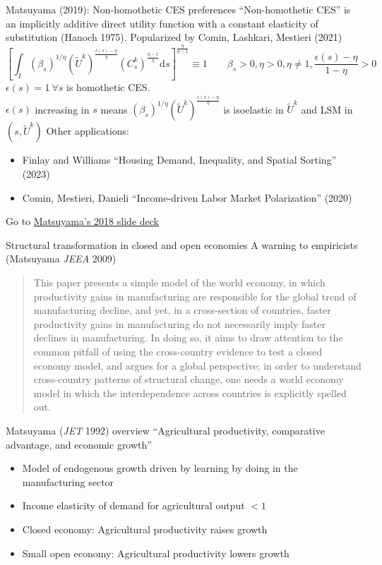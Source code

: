 \documentclass[11pt,notes=hide,aspectratio=169]{beamer}
\begin{document}
\begin{frame}{Matsuyama (2019): Non-homothetic CES preferences}
``Non-homothetic CES'' is an implicitly additive direct utility function with a constant elasticity of substitution (Hanoch 1975). Popularized by Comin, Lashkari, Mestieri (2021)
\begin{equation*}
\left[\int_{I}\left(\beta_{s}\right)^{1/\eta}\left(\tilde{U}^{k}\right)^{\frac{\epsilon(s) - \eta}{\eta}}\left(C^k_s\right)^{\frac{\eta-1}{\eta}}\textrm{d} s\right]^{\frac{\eta}{\eta-1}}
\equiv 1
\qquad
\beta_{s} > 0, \eta > 0, \eta \neq 1, \frac{\epsilon(s)-\eta}{1-\eta} >0
\end{equation*}
$\epsilon(s) = 1 \ \forall s$ is homothetic CES.\\
$\epsilon(s)$ increasing in $s$ means
$\left(\beta_{s}\right)^{1/\eta}\left(\tilde{U}^{k}\right)^{\frac{\epsilon(s) - \eta}{\eta}}$
is isoelastic in $\tilde{U}^{k}$ and LSM in $(s,\tilde{U}^{k})$
\smallskip
Other applications:
\begin{itemize}
\item {\small Finlay and Williams ``Housing Demand, Inequality, and Spatial Sorting'' (2023)}
\item {\small Comin, Mestieri, Danieli ``Income-driven Labor Market Polarization'' (2020)}
\end{itemize}
Go to \href{https://shorturl.at/txBKR}{Matsuyama's 2018 slide deck}
\end{frame}
\begin{frame}{Structural transformation in closed and open economies}
A warning to empiricists (Matsuyama \textit{JEEA} 2009)
\begin{quote}
This paper presents a simple model of the world economy, in which productivity gains in manufacturing are responsible for the global trend of manufacturing decline, and yet, in a cross-section of countries, faster productivity gains in manufacturing do not necessarily imply faster declines in manufacturing.
In doing so, it aims to draw attention to the common pitfall of using the cross-country evidence to test a closed economy model, and argues for a global perspective; in order to understand cross-country patterns of structural change, one needs a world economy model in which the interdependence across countries is explicitly spelled out.
\end{quote}
\end{frame}
\begin{frame}{Matsuyama (\textit{JET} 1992) overview}
{\small ``Agricultural productivity, comparative advantage, and economic growth''}
\begin{itemize}
\item Model of endogenous growth driven by learning by doing in the manufacturing sector
\item Income elasticity of demand for agricultural output $<1$
\item Closed economy: Agricultural productivity raises growth
\item Small open economy: Agricultural productivity lowers growth
\end{itemize}
\end{frame}
\end{document}
